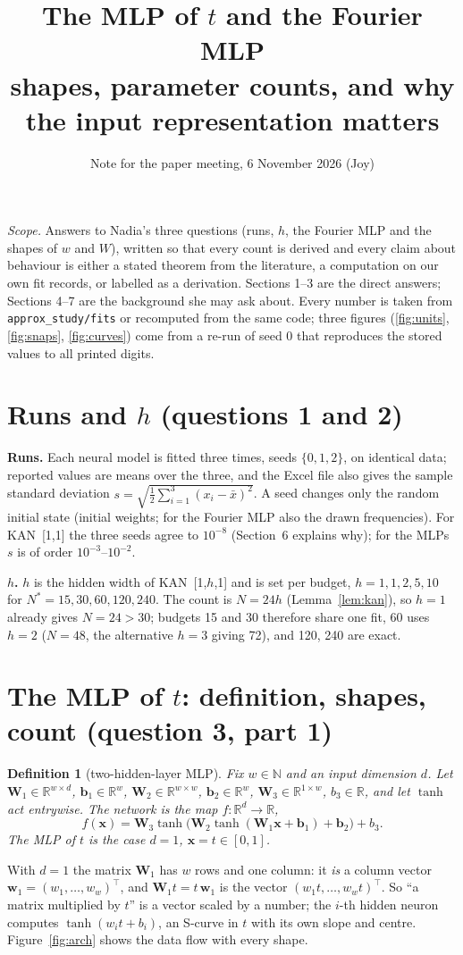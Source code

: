 \documentclass[11pt,a4paper]{article}
\title{\vspace{-1.2cm}The MLP of $t$ and the Fourier MLP\\[2pt]\large shapes, parameter counts, and why the input representation matters}
\author{Note for the paper meeting, 6 November 2026 (Joy)}
\date{}
\newtheorem{definition}{Definition}\newtheorem{lemma}{Lemma}\newtheorem{proposition}{Proposition}\newtheorem{remark}{Remark}\newtheorem{fact}{Fact}
\newcommand{\R}{\mathbb R}
\begin{document}
\maketitle
\vspace{-0.9cm}
\noindent\textit{Scope.} Answers to Nadia's three questions (runs, $h$, the Fourier MLP and the shapes of $w$ and $W$), written so that every count is derived and every claim about behaviour is either a stated theorem from the literature, a computation on our own fit records, or labelled as a derivation. Sections 1--3 are the direct answers; Sections 4--7 are the background she may ask about. Every number is taken from \texttt{approx\_study/fits} or recomputed from the same code; three figures (\ref{fig:units}, \ref{fig:snaps}, \ref{fig:curves}) come from a re-run of seed 0 that reproduces the stored values to all printed digits.

\section{Runs and $h$ (questions 1 and 2)}
\textbf{Runs.} Each neural model is fitted three times, seeds $\{0,1,2\}$, on identical data; reported values are means over the three, and the Excel file also gives the sample standard deviation $s=\sqrt{\tfrac1{2}\sum_{i=1}^{3}(x_i-\bar x)^2}$. A seed changes only the random initial state (initial weights; for the Fourier MLP also the drawn frequencies). For KAN~[1,1] the three seeds agree to $10^{-8}$ (Section~6 explains why); for the MLPs $s$ is of order $10^{-3}$--$10^{-2}$.

\textbf{$h$.} $h$ is the hidden width of KAN~[1,$h$,1] and is set per budget, $h=1,1,2,5,10$ for $N^*=15,30,60,120,240$. The count is $N=24h$ (Lemma~\ref{lem:kan}), so $h=1$ already gives $N=24>30$; budgets 15 and 30 therefore share one fit, 60 uses $h=2$ ($N=48$, the alternative $h=3$ giving 72), and 120, 240 are exact.

\section{The MLP of $t$: definition, shapes, count (question 3, part 1)}
\begin{definition}[two-hidden-layer MLP]
Fix $w\in\mathbb N$ and an input dimension $d$. Let $\bm W_1\in\R^{w\times d}$, $\bm b_1\in\R^{w}$, $\bm W_2\in\R^{w\times w}$, $\bm b_2\in\R^{w}$, $\bm W_3\in\R^{1\times w}$, $b_3\in\R$, and let $\tanh$ act entrywise. The network is the map $f:\R^d\to\R$,
\begin{equation}
f(\bm x)=\bm W_3\tanh\!\bigl(\bm W_2\tanh(\bm W_1\bm x+\bm b_1)+\bm b_2\bigr)+b_3 .
\label{eq:mlp}
\end{equation}
The \emph{MLP of $t$} is the case $d=1$, $\bm x=t\in[0,1]$.
\end{definition}
With $d=1$ the matrix $\bm W_1$ has $w$ rows and one column: it \emph{is} a column vector $\bm w_1=(w_{1},\dots,w_{w})^{\!\top}$, and $\bm W_1 t=t\,\bm w_1$ is the vector $(w_1 t,\dots,w_w t)^{\!\top}$. So ``a matrix multiplied by $t$'' is a vector scaled by a number; the $i$-th hidden neuron computes $\tanh(w_i t+b_i)$, an S-curve in $t$ with its own slope and centre. Figure~\ref{fig:arch} shows the data flow with every shape.
\end{document}
